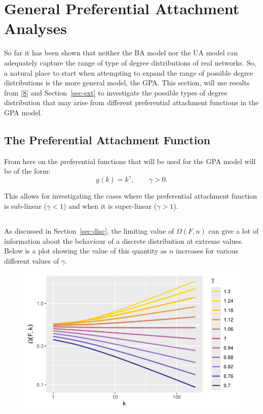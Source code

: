 \documentclass[
  10pt,
  a4paper,
]{scrreprt}
\theoremstyle{plain}
\theoremstyle{definition}
\theoremstyle{plain}
\theoremstyle{remark}
\begin{document}
{\hypertarget{general-preferential-attachment-analyses}{%
\section{General Preferential Attachment
Analyses}\label{general-preferential-attachment-analyses}}

So far it has been shown that neither the BA model nor the UA model can
adequately capture the range of type of degree distributions of real
networks. So, a natural place to start when attempting to expand the
range of possible degree distributions is the more general model, the
GPA. This section, will use results from
{[}\protect\hyperlink{ref-shimura12}{8}{]} and Section~\ref{sec-ext} to
investigate the possible types of degree distribution that may arise
from different preferential attachment functions in the GPA model.

\hypertarget{the-preferential-attachment-function}{%
\subsection{The Preferential Attachment
Function}\label{the-preferential-attachment-function}}

From here on the preferential functions that will be used for the GPA
model will be of the form: \[
g(k) = k^\gamma, \qquad \gamma>0.
\]

This allows for investigating the cases where the preferential
attachment function is sub-linear (\(\gamma<1\)) and when it is
super-linear (\(\gamma>1\)).

\hypertarget{section}{%
\subsection{}\label{section}}

As discussed in Section~\ref{sec-disc}, the limiting value of
\(\Omega(F,n)\) can give a lot of information about the behaviour of a
discrete distribution at extreme values. Below is a plot showing the
value of this quantity as \(n\) increases for various different values
of \(\gamma\).

\begin{figure}[H]

{\centering \includegraphics{doc_files/figure-pdf/fig-omega-1.pdf}

}
\end{figure}}
\end{document}
